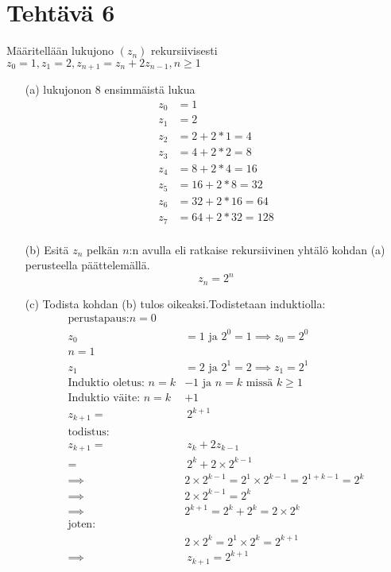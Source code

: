 \documentclass{article}
\begin{document}
    \newpage
	\section*{Tehtävä 6}
    Määritellään lukujono $(z_{n})$ rekursiivisesti \newline
    $z_0 = 1, z_1 = 2, z_{n+1} = z_n + 2z_{n-1}, n \geq 1$ \newline

    \begin{enumerate}
        \item[(a)]
        lukujonon 8 ensimmäistä lukua
        \[
        \begin{aligned}
            z_0 &= 1\\
            z_1 &= 2\\
            z_2 &= 2 + 2 * 1 = 4\\
            z_3 &= 4 + 2 * 2 = 8\\
            z_4 &= 8 + 2 * 4 = 16\\
            z_5 &= 16 + 2 * 8 = 32\\
            z_6 &= 32 + 2 * 16 = 64\\
            z_7 &= 64 + 2 * 32 = 128\\
        \end{aligned}
        \]
        \item[(b)]
        Esitä $z_n$ pelkän $n$:n avulla eli ratkaise rekursiivinen yhtälö kohdan (a) perusteella päättelemällä.
        \[
        z_n = 2^n
        \]
        \item[(c)]
        Todista kohdan (b) tulos oikeaksi.\newline Todistetaan induktiolla: 
        \[
            \begin{aligned}
                \text{perustapaus:} n = 0& \\
                z_0 &= 1 \text{ ja } 2^0 = 1 \implies z_0 = 2^0\\
                n = 1& \\
                z_1 &= 2 \text{ ja } 2^1 = 2 \implies z_1 = 2^1\\[10pt]
            \text{Induktio oletus: } n = k& - 1 \text{ ja } n = k \text{ missä } k \geq 1\\
            \text{Induktio väite: } n = k& + 1 \\
            z_{k + 1} =& \ 2^{k + 1}\\
            \text{todistus:}\\
            z_{k + 1} =& \ z_k + 2z_{k - 1}\\
            =& \ 2^k + 2 \times 2^{k - 1}\\
            \implies & 2 \times 2^{k - 1} = 2^1 \times 2^{k - 1} = 2^{1 + k - 1} = 2^k\\
            \implies & 2 \times 2^{k - 1} = 2^k\\
            \implies & 2^{k + 1} = 2^k + 2^k = 2 \times 2^k\\[5pt]
            \text{joten:}&\\
            & 2 \times 2^k = 2^1 \times 2^k = 2^{k + 1}\\
            \implies & \ z_{k + 1} = 2^{k + 1}
            \end{aligned}
        \]
        

    \end{enumerate}
\end{document}
